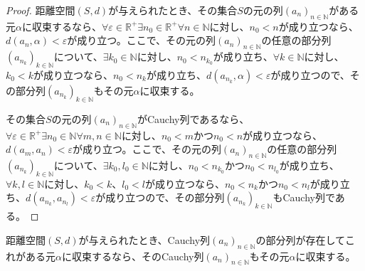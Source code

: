 \documentclass[dvipdfmx]{jsarticle}
\begin{document}
\begin{proof}
距離空間$(S,d)$が与えられたとき、その集合$S$の元の列$\left( a_{n} \right)_{n \in \mathbb{N}}$がある元$\alpha$に収束するなら、$\forall\varepsilon \in \mathbb{R}^{+}\exists n_{0} \in \mathbb{R}^{+}\forall n \in \mathbb{N}$に対し、$n_{0} < n$が成り立つなら、$d\left( a_{n},\alpha \right) < \varepsilon$が成り立つ。ここで、その元の列$\left( a_{n} \right)_{n \in \mathbb{N}}$の任意の部分列$\left( a_{n_{k}} \right)_{k \in \mathbb{N}}$について、$\exists k_{0} \in \mathbb{N}$に対し、$n_{0} < n_{k_{0}}$が成り立ち、$\forall k \in \mathbb{N}$に対し、$k_{0} < k$が成り立つなら、$n_{0} < n_{k}$が成り立ち、$d\left( a_{n_{k}},\alpha \right) < \varepsilon$が成り立つので、その部分列$\left( a_{n_{k}} \right)_{k \in \mathbb{N}}$もその元$\alpha$に収束する。\par
その集合$S$の元の列$\left( a_{n} \right)_{n \in \mathbb{N}}$がCauchy列であるなら、$\forall\varepsilon \in \mathbb{R}^{+}\exists n_{0} \in \mathbb{N}\forall m,n \in \mathbb{N}$に対し、$n_{0} < m$かつ$n_{0} < n$が成り立つなら、$d\left( a_{m},a_{n} \right) < \varepsilon$が成り立つ。ここで、その元の列$\left( a_{n} \right)_{n \in \mathbb{N}}$の任意の部分列$\left( a_{n_{k}} \right)_{k \in \mathbb{N}}$について、$\exists k_{0},l_{0} \in \mathbb{N}$に対し、$n_{0} < n_{k_{0}}$かつ$n_{0} < n_{l_{0}}$が成り立ち、$\forall k,l \in \mathbb{N}$に対し、$k_{0} < k$、$l_{0} < l$が成り立つなら、$n_{0} < n_{k}$かつ$n_{0} < n_{l}$が成り立ち、$d\left( a_{n_{k}},a_{n_{l}} \right) < \varepsilon$が成り立つので、その部分列$\left( a_{n_{k}} \right)_{k \in \mathbb{N}}$もCauchy列である。
\end{proof}
\begin{thm}\label{8.2.4.19}
距離空間$(S,d)$が与えられたとき、Cauchy列$\left( a_{n} \right)_{n \in \mathbb{N}}$の部分列が存在してこれがある元$\alpha$に収束するなら、そのCauchy列$\left( a_{n} \right)_{n \in \mathbb{N}}$もその元$\alpha$に収束する。
\end{thm}
\end{document}

